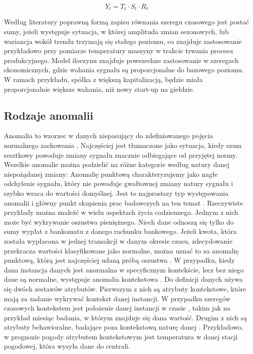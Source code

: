 \documentclass[a4paper,twoside,12pt]{book}
\begin{document}
	\begin{equation}
		Y_t = T_t \cdot S_t \cdot R_t
		\label{eq:multiplicative_model}
	\end{equation}
	
	Według literatury poprawną formą zapisu równania szeregu czasowego jest postać sumy, jeżeli występuje sytuacja, w której amplituda zmian sezonowych, lub wariancja wokół trendu trzymają się stałego poziomu, co znajduje zastosowanie przykładowo przy pomiarze temperatury maszyny w trakcie trwania procesu produkcyjnego. Model iloczynu znajduje powszechne zastosowanie w szeregach ekonomicznych, gdzie wahania sygnału są proporcjonalne do bazowego poziomu. W ramach przykładu, spółka z większą kapitalizacją, będzie miała proporcjonalnie większe wahania, niż nowy start-up na giełdzie.
	
	\subsection{Rodzaje anomalii}
	Anomalia to wzorzec w danych niepasujący do zdefiniowanego pojęcia normalnego zachowania \cite{chandola2009anomaly}. Najczęściej jest tłumaczone jako sytuacja, kiedy szum resztkowy powoduje zmiany sygnału znacznie odbiegające od przyjętej normy. Wszelkie anomalie można podzielić na różne kategorie według natury danej niepożądanej zmiany:
	Anomalię punktową charakteryzujemy jako nagłe odchylenie sygnału, który nie powoduje gwałtownej zmiany natury sygnału i szybko wraca do wartości domyślnej. Jest to najprostszy typ występowania anomalii i główny punkt skupienia prac badawczych na ten temat \cite{chandola2009anomaly}. Rzeczywiste przykłady można znaleźć w wielu aspektach życia codziennego. Jednym z nich może być wykrywanie oszustwa pieniężnego. Niech dane odnoszą się tylko do sumy wypłat z bankomatu z danego rachunku bankowego. Jeżeli kwota, która została wypłacona w jednej transakcji w danym okresie czasu, zdecydowanie przekracza wartości klasyfikowane jako normalne, można uznać to za anomalię punktową, którą jest najczęściej udaną próbą oszustwa \cite{chandola2009anomaly}.
	W przypadku, kiedy dana instancja danych jest anormalna w specyficznym kontekście, lecz bez niego dane są normalne, występuje anomalia kontekstowa \cite{chandola2009anomaly}. Do definicji danych używa się dwóch zestawów atrybutów. Pierwszym z nich są atrybuty kontekstowe, które mają za zadanie wykrywać kontekst danej instancji. W przypadku szeregów czasowych kontekstem jest położenie danej instancji w czasie \cite{chandola2009anomaly}, takim jak na przykład miesiąc badania, w którym znajduje się dana wartość. Drugim z nich są atrybuty behawioralne, badające poza kontekstową naturę danej \cite{chandola2009anomaly}. Przykładowo, w prognozie pogody atrybutem kontekstowym jest temperatura w danej stacji pogodowej, która wysyła dane do centrali.
\end{document}
